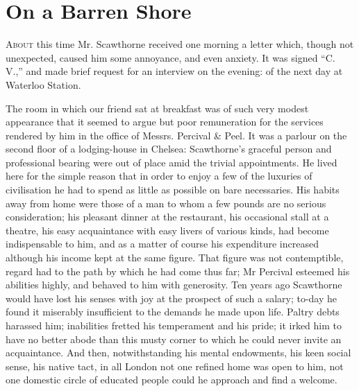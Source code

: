 \chapter{On a Barren Shore}

\textsc{About} this time Mr. Scawthorne received one morning a letter
which, though not unexpected, caused him some annoyance, and even
anxiety. It was signed ``C. V.,'' and made brief request for an
interview on the evening: of the next day at Waterloo Station.

The room in which our friend sat at breakfast was of such very modest
appearance that it seemed to argue but poor remuneration for the
services rendered by him in the office of Messrs. Percival \& Peel. It
was a parlour on the second floor of a lodging-house in Chelsea:
Scawthorne's graceful person and professional bearing were out of place
amid the trivial appointments. He lived here for the simple reason that
in order to enjoy a few of the luxuries of civilisation he had to spend
as little as possible on bare necessaries. His habits {}away from home
were those of a man to whom a few pounds are no serious consideration;
his pleasant dinner at the restaurant, his occasional stall at a
theatre, his easy acquaintance with easy livers of various kinds, had
become indispensable to him, and as a matter of course his expenditure
increased although his income kept at the same figure. That figure was
not contemptible, regard had to the path by which he had come thus far;
Mr Percival esteemed his abilities highly, and behaved to him with
generosity. Ten years ago Scawthorne would have lost his senses with joy
at the prospect of such a salary; to-day he found it miserably
insufficient to the demands he made upon life. Paltry debts harassed
him; inabilities fretted his temperament and his pride; it irked him to
have no better abode than this musty corner to which he could never
invite an acquaintance. And then, notwithstanding his mental endowments,
his keen social sense, his native tact, in all London not one refined
home was open to him, not one domestic circle of educated people could
he approach and find a welcome.


